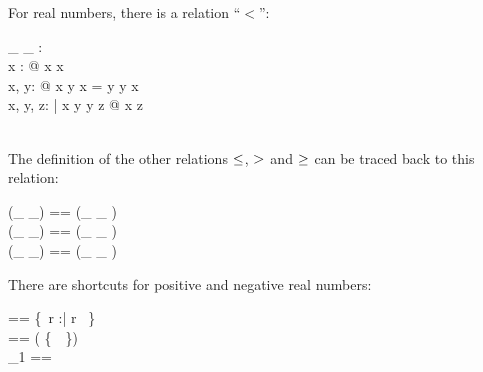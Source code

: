 \documentclass[12pt]{article}
\begin{document}
For real numbers, there is a relation ``$<$'':
%
\begin{axdef}
  \_ \alt \_ : \real \rel \real\\
  \where
  \forall x : \real @ \lnot x \alt x\\
  \forall x, y: \real @ x \alt y \lor x = y \lor y \alt x\\
  \forall x, y, z: \real | x \alt y \land y \alt z @ x \alt z \\
  \azero \alt \aone\\
\end{axdef}
%
The definition of the other relations $\leq$, $>$ and $\geq$ can
be traced back to this relation:
%
\begin{zed}
  (\_ \aleq \_) == (\_ \alt \_ ) \cup \id \real \\
  (\_ \agt \_) == (\_ \alt \_ ) \inv \\
  (\_ \ageq \_) == (\_ \agt \_ ) \cup \id \real \\
\end{zed}
%
There are shortcuts for positive and negative real numbers:
%
\begin{zed}
  \realplus == \{~r :\real | r \agt \azero~\}\\
  \realminus == \real \setminus ( \realplus \cup \{~\azero~\})\\
  \real_1 == \realplus \cup \realminus \\
\end{zed}
%
%

%
\end{document}
